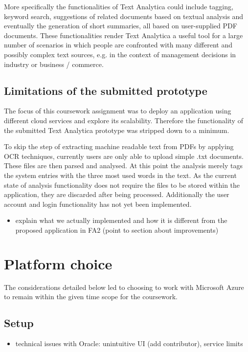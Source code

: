 \documentclass[conference]{IEEEtran}
\begin{document}
More specifically the functionalities of Text Analytica could include tagging, keyword search, suggestions of related documents based on textual analysis and eventually the generation of short summaries, all based on user-supplied PDF documents. These functionalities render Text Analytica a useful tool for a large number of scenarios in which people are confronted with many different and possibly complex text sources, e.g. in the context of management decisions in industry or business / commerce.

\subsection{Limitations of the submitted prototype}
The focus of this coursework assignment was to deploy an application using different cloud services and explore its scalability. Therefore the functionality of the submitted Text Analytica prototype was stripped down to a minimum.

To skip the step of extracting machine readable text from PDFs by applying OCR techniques, currently users are only able to upload simple .txt documents. These files are then parsed and analysed. At this point the analysis merely tags the system entries with the three most used words in the text. As the current state of analysis functionality does not require the files to be stored within the application, they are discarded after being processed. Additionally the user account and login functionality has not yet been implemented.

\begin{itemize}
	\item explain what we actually implemented and how it is different from the proposed application in FA2 (point to section about improvements)
\end{itemize}

\section{Platform choice}
The considerations detailed below led to choosing to work with Microsoft Azure to remain within the given time scope for the coursework.
\subsection{Setup}
\begin{itemize}
	\item technical issues with Oracle: unintuitive UI (add contributor), service limits
\end{itemize}
\end{document}
